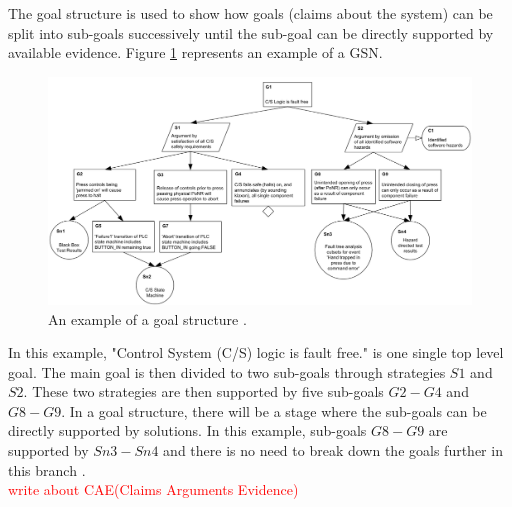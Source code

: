 The goal structure is used to show how goals (claims about the system) can be split into sub-goals successively until the sub-goal can be directly supported by available evidence. Figure \ref{fig:gsn-example} represents an example of a GSN.

\begin{figure}
    \includegraphics[width=0.9\linewidth ]{figures/gsn-example.png}
    \centering
    \caption{An example of a goal structure \cite{gsn2004Kelly}.}
    \label{fig:gsn-example}
\end{figure}

In this example, "Control System (C/S) logic is fault free." is one single top level goal. The main goal is then divided to two sub-goals through strategies $S1$ and $S2$. These two strategies are then supported by five sub-goals $G2-G4$ and $G8-G9$. In a goal structure, there will be a stage where the sub-goals can be directly supported by solutions. In this example, sub-goals $G8-G9$ are supported by $Sn3-Sn4$ and there is no need to break down the goals further in this branch \cite{gsn2004Kelly}.\\
\textcolor{red}{write about CAE(Claims Arguments Evidence)}
